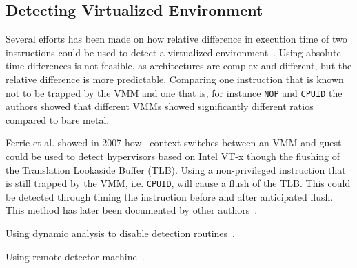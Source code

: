 \subsection{Detecting Virtualized Environment}


Several efforts has been made on how relative difference in execution time of
two instructions could be used to detect a virtualized
environment~\cite{raffetseder2007, thompson}. Using absolute time differences is
not feasible, as architectures are complex and different, but the relative
difference is more predictable. Comparing one instruction that is known not to
be trapped by the VMM and one that is, for instance {\tt NOP} and {\tt CPUID}
the authors showed that different VMMs showed significantly different ratios
compared to bare metal.

Ferrie {et al.} showed in 2007 how~\cite{ferrie2007} context switches between an
VMM and guest could be used to detect hypervisors based on Intel VT-x though the
flushing of the Translation Lookaside Buffer (TLB). Using a non-privileged
instruction that is still trapped by the VMM, i.e. {\tt CPUID}, will cause a
flush of the TLB. This could be detected through timing the instruction before
and after anticipated flush. This method has later been documented by other
authors~\cite{thompson}.

Using dynamic analysis to disable detection routines~\cite{kang2009}.

Using remote detector machine~\cite{franklin2008}.

